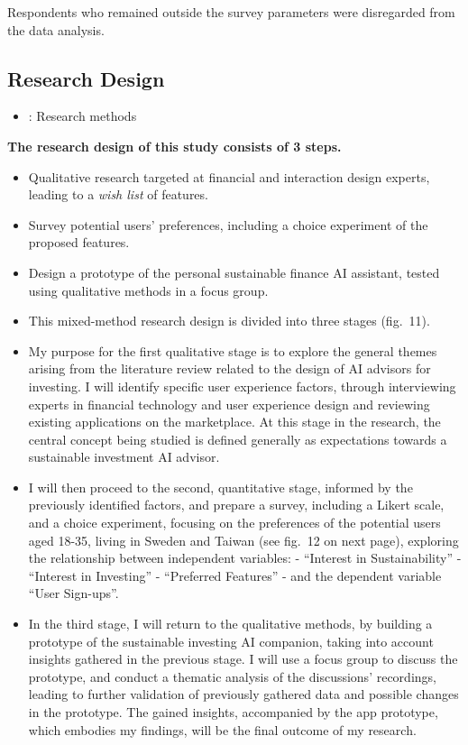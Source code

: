 \documentclass[
  letterpaper,
  DIV=11,
  numbers=noendperiod]{scrartcl}
\providecommand{\tightlist}{%
  \setlength{\itemsep}{0pt}\setlength{\parskip}{0pt}}\usepackage{longtable,booktabs,array}
\begin{document}
Respondents who remained outside the survey parameters were disregarded
from the data analysis.

\subsection{Research Design}\label{research-design}

\begin{itemize}
\tightlist
\item
  \citet{christianrohrerWhenUseWhich2022}: Research methods
\end{itemize}

\textbf{The research design of this study consists of 3 steps.}

\begin{itemize}
\tightlist
\item
  Qualitative research targeted at financial and interaction design
  experts, leading to a \emph{wish list} of features.
\item
  Survey potential users' preferences, including a choice experiment of
  the proposed features.
\item
  Design a prototype of the personal sustainable finance AI assistant,
  tested using qualitative methods in a focus group.
\item
  This mixed-method research design is divided into three stages
  (fig.~11).
\item
  My purpose for the first qualitative stage is to explore the general
  themes arising from the literature review related to the design of AI
  advisors for investing. I will identify specific user experience
  factors, through interviewing experts in financial technology and user
  experience design and reviewing existing applications on the
  marketplace. At this stage in the research, the central concept being
  studied is defined generally as expectations towards a sustainable
  investment AI advisor.
\item
  I will then proceed to the second, quantitative stage, informed by the
  previously identified factors, and prepare a survey, including a
  Likert scale, and a choice experiment, focusing on the preferences of
  the potential users aged 18-35, living in Sweden and Taiwan (see
  fig.~12 on next page), exploring the relationship between independent
  variables: - ``Interest in Sustainability'' - ``Interest in
  Investing'' - ``Preferred Features'' - and the dependent variable
  ``User Sign-ups''.
\item
  In the third stage, I will return to the qualitative methods, by
  building a prototype of the sustainable investing AI companion, taking
  into account insights gathered in the previous stage. I will use a
  focus group to discuss the prototype, and conduct a thematic analysis
  of the discussions' recordings, leading to further validation of
  previously gathered data and possible changes in the prototype. The
  gained insights, accompanied by the app prototype, which embodies my
  findings, will be the final outcome of my research.
\end{itemize}
\end{document}
